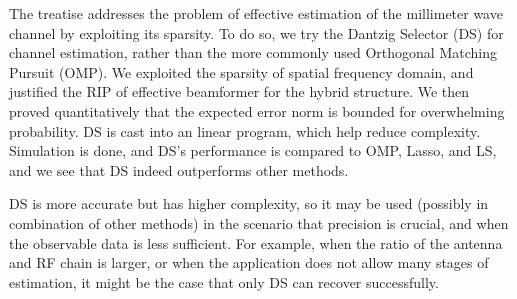 
\startchapter [title={Conclusion}]

The treatise addresses the problem of effective estimation of the millimeter wave channel by exploiting its sparsity.
To do so, we try the Dantzig Selector (DS) for channel estimation, rather than the more commonly used Orthogonal Matching Pursuit (OMP).
We exploited the sparsity of spatial frequency domain, and justified the RIP of effective beamformer for the hybrid structure.
We then proved quantitatively that the expected error norm is bounded for overwhelming probability.
DS is cast into an linear program, which help reduce complexity.
Simulation is done, and DS's performance is compared to OMP, Lasso, and LS, and we see that DS indeed outperforms other methods.

DS is more accurate but has higher complexity, so it may be used (possibly in combination of other methods) in the scenario that precision is crucial, and when the observable data is less sufficient.
For example, when the ratio of the antenna and RF chain is larger, or when the application does not allow many stages of estimation, it might be the case that only DS can recover successfully.


\stopchapter


